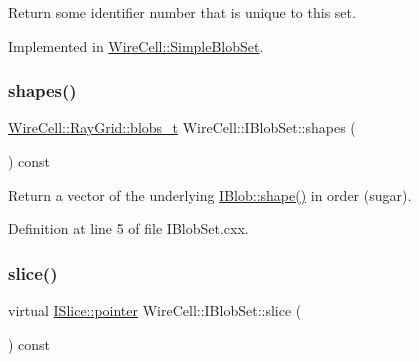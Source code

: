 Return some identifier number that is unique to this set. 



Implemented in \hyperlink{class_wire_cell_1_1_simple_blob_set_ad3ac749afa97671793e1c16e390c3534}{Wire\+Cell\+::\+Simple\+Blob\+Set}.

\mbox{\label{class_wire_cell_1_1_i_blob_set_abf09ebcd27b5dea4b7608ec7fd5abbc0}} 
\subsubsection{\texorpdfstring{shapes()}{shapes()}}
{\footnotesize\ttfamily \hyperlink{namespace_wire_cell_1_1_ray_grid_aea2069aff62790df3241ee7446e81ade}{Wire\+Cell\+::\+Ray\+Grid\+::blobs\+\_\+t} Wire\+Cell\+::\+I\+Blob\+Set\+::shapes (\begin{DoxyParamCaption}{ }\end{DoxyParamCaption}) const\hspace{0.3cm}{\ttfamily [virtual]}}



Return a vector of the underlying \hyperlink{class_wire_cell_1_1_i_blob_a241a18f7f178a2021c643ffb6eed6e3f}{I\+Blob\+::shape()} in order (sugar). 



Definition at line 5 of file I\+Blob\+Set.\+cxx.

\mbox{\label{class_wire_cell_1_1_i_blob_set_ac3fae97101f3ab70f6833296e43817a3}} 
\subsubsection{\texorpdfstring{slice()}{slice()}}
{\footnotesize\ttfamily virtual \hyperlink{class_wire_cell_1_1_i_data_aff870b3ae8333cf9265941eef62498bc}{I\+Slice\+::pointer} Wire\+Cell\+::\+I\+Blob\+Set\+::slice (\begin{DoxyParamCaption}{ }\end{DoxyParamCaption}) const\hspace{0.3cm}{\ttfamily [pure virtual]}}


